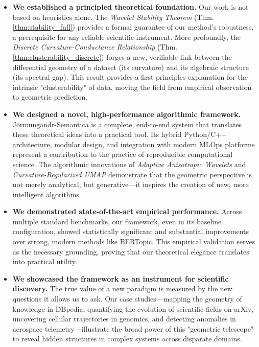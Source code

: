 \begin{itemize}
    \item \textbf{We established a principled theoretical foundation.} Our work is not based on heuristics alone. The \textit{Wavelet Stability Theorem} (Thm. \ref{thm:stability_full}) provides a formal guarantee of our method's robustness, a prerequisite for any reliable scientific instrument. More profoundly, the \textit{Discrete Curvature-Conductance Relationship} (Thm. \ref{thm:clusterability_discrete}) forges a new, verifiable link between the differential geometry of a dataset (its curvature) and its algebraic structure (its spectral gap). This result provides a first-principles explanation for the intrinsic "clusterability" of data, moving the field from empirical observation to geometric prediction.

    \item \textbf{We designed a novel, high-performance algorithmic framework.} Jörmungandr-Semantica is a complete, end-to-end system that translates these theoretical ideas into a practical tool. Its hybrid Python/C++ architecture, modular design, and integration with modern MLOps platforms represent a contribution to the practice of reproducible computational science. The algorithmic innovations of \textit{Adaptive Anisotropic Wavelets} and \textit{Curvature-Regularized UMAP} demonstrate that the geometric perspective is not merely analytical, but generative—it inspires the creation of new, more intelligent algorithms.

    \item \textbf{We demonstrated state-of-the-art empirical performance.} Across multiple standard benchmarks, our framework, even in its baseline configuration, showed statistically significant and substantial improvements over strong, modern methods like BERTopic. This empirical validation serves as the necessary grounding, proving that our theoretical elegance translates into practical utility.

    \item \textbf{We showcased the framework as an instrument for scientific discovery.} The true value of a new paradigm is measured by the new questions it allows us to ask. Our case studies—mapping the geometry of knowledge in DBpedia, quantifying the evolution of scientific fields on arXiv, uncovering cellular trajectories in genomics, and detecting anomalies in aerospace telemetry—illustrate the broad power of this "geometric telescope" to reveal hidden structures in complex systems across disparate domains.
\end{itemize}

